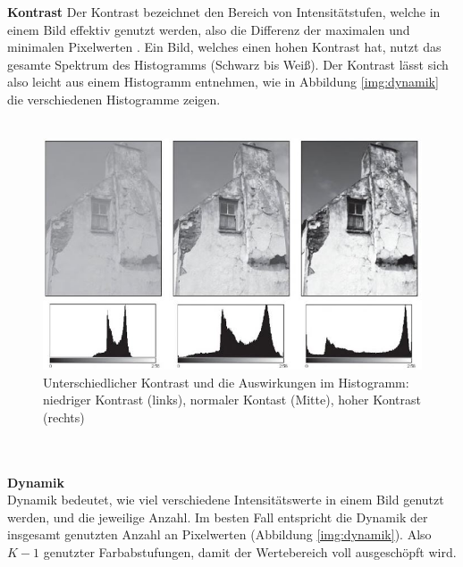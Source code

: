\textbf{Kontrast}\label{s.kontrast}
Der Kontrast bezeichnet den Bereich von Intensitätstufen, welche in einem Bild effektiv genutzt werden, also die Differenz der maximalen und minimalen Pixelwerten \cite[44]{burger2009digitale}. Ein Bild, welches einen hohen Kontrast hat, nutzt das gesamte Spektrum des Histogramms (Schwarz bis Weiß). Der Kontrast lässt sich also leicht aus einem Histogramm entnehmen, wie in Abbildung \ref{img:dynamik} die verschiedenen Histogramme zeigen.\\\\
  \begin{figure}
    [h]
    \centering
    \includegraphics[scale=0.7]{Sources/kontrast.JPG}
    \caption{Unterschiedlicher Kontrast und die Auswirkungen im Histogramm: niedriger Kontrast (links), normaler Kontast (Mitte), hoher Kontrast (rechts)\cite[45]{burger2009digitale}}
    \label{img:kontrast}
  \end{figure}\\\\
\textbf{Dynamik}\label{s.dynamik}\\
Dynamik bedeutet, wie viel verschiedene Intensitätswerte in einem Bild genutzt werden, und die jeweilige Anzahl\cite[44]{burger2009digitale}. Im besten Fall entspricht die Dynamik der insgesamt genutzten Anzahl an Pixelwerten (Abbildung \ref{img:dynamik}). Also $K-1$ genutzter Farbabstufungen, damit der Wertebereich voll ausgeschöpft wird.\\
